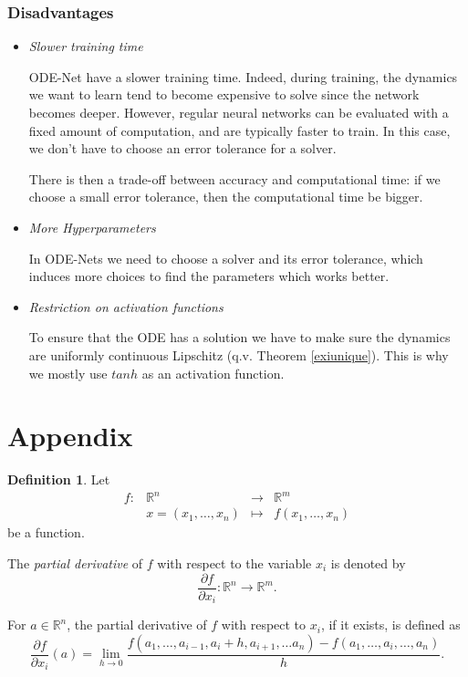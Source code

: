 \documentclass[10pt,a4paper]{article}
\theoremstyle{definition}
\newtheorem{definition}{Definition}
\theoremstyle{definition}
\theoremstyle{definition}
\begin{document}
\subsubsection*{Disadvantages}
\begin{itemize}
\item \textit{Slower training time}

ODE-Net have a slower training time. Indeed, during training, the dynamics we want to learn tend to become expensive to solve since the network becomes deeper. However, regular neural networks can be evaluated with a fixed amount of computation, and are typically faster to train. In this case, we don't have to choose an error tolerance for a solver.

There is then a trade-off between accuracy and computational time: if we choose a small error tolerance, then the computational time be bigger.

\item \textit{More Hyperparameters}

In ODE-Nets we need to choose a solver and its error tolerance, which induces more choices to find the parameters which works better.

\item \textit{Restriction on activation functions}

To ensure that the ODE has a solution we have to make sure the dynamics are uniformly continuous Lipschitz (q.v. Theorem \ref{exiunique}). This is why we mostly use $tanh$ as an activation function.
\end{itemize}

\newpage

\section{Appendix}\label{annex}

\begin{definition}
Let   $$\begin{array}{rclc}
f: & \mathbb{R}^n & \rightarrow &  \mathbb{R}^m \\
&x = (x_1, \dots, x_n) & \mapsto & f(x_1, \dots, x_n)
\end{array}$$ be a function.

The \textit{partial derivative} of $f$ with respect to the variable $x_i$ is denoted by
$$
\frac{\partial f}{\partial x_i} :\mathbb{R}^n \rightarrow \mathbb{R}^m.
$$

For $a\in \mathbb{R}^n$, the partial derivative of $f$ with respect to $x_i$, if it exists, is defined as
$$
\frac{\partial f}{\partial x_i}(a) = \lim_{h\rightarrow0}\frac{f(a_1,\dots , a_{i-1}, a_i + h, a_{i+1}, \dots a_n) - f(a_1,\dots, a_i,\dots, a_n)}{h}.
$$
\end{definition}
\end{document}
